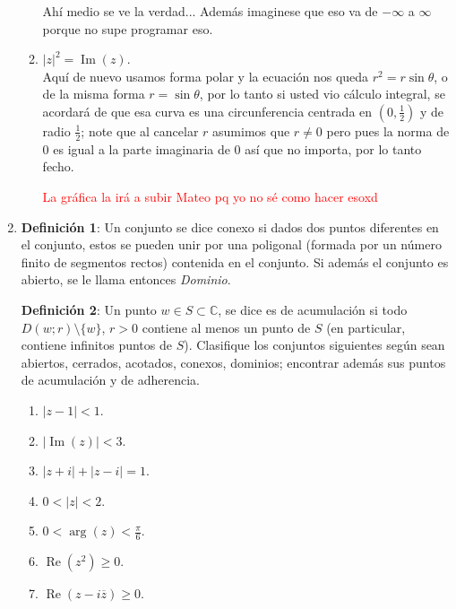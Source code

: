 \documentclass[11pt]{article}
\begin{document}
\begin{enumerate}
\begin{enumerate}
        Ahí medio se ve la verdad... Además imaginese que eso va de $-\infty$ a $\infty$ porque no supe programar eso.
        \item $|z|^2 = \operatorname{Im}(z)$.\\
        Aquí de nuevo usamos forma polar y la ecuación nos queda $r^2=r\sin{\theta}$, o de la misma forma $r=\sin{\theta}$, por lo tanto si usted vio cálculo integral, se acordará de que esa curva es una circunferencia centrada en $(0,\frac{1}{2})$ y de radio $\frac{1}{2}$; note que al cancelar $r$ asumimos que $r\neq 0$ pero pues la norma de 0 es igual a la parte imaginaria de 0 así que no importa, por lo tanto fecho.

        \textcolor{red}{La gráfica la irá a subir Mateo pq yo no sé como hacer esoxd}
    \end{enumerate}

    \item \textbf{Definición 1}: Un conjunto se dice conexo si dados dos puntos diferentes en el conjunto, estos se pueden unir por una poligonal (formada por un número finito de segmentos rectos) contenida en el conjunto. Si además el conjunto es abierto, se le llama entonces \textit{Dominio}.

    \textbf{Definición 2}: Un punto $w \in S \subset \mathbb{C}$, se dice es de acumulación si todo $D(w; r) \setminus \{w\}$, $r > 0$ contiene al menos un punto de $S$ (en particular, contiene infinitos puntos de $S$). Clasifique los conjuntos siguientes según sean abiertos, cerrados, acotados, conexos, dominios; encontrar además sus puntos de acumulación y de adherencia.
    \begin{enumerate}
        \item $|z - 1| < 1$.

        

        \item $|\operatorname{Im}(z)| < 3$.
        


        \item $|z + i| + |z - i| = 1$.



        \item $0 < |z| < 2$.
        


        \item $0 < \arg(z) < \frac{\pi}{6}$.
        


        \item $\operatorname{Re}(z^2) \geq 0$.
        


        \item $\operatorname{Re}(z - i \overline{z}) \geq 0$.
    \end{enumerate}
\end{enumerate}
\end{document}
